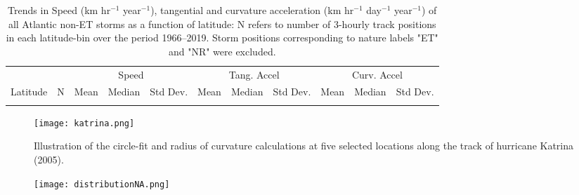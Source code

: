 \documentclass[wcd,manuscript]{copernicus}
\begin{document}





\begin{table*}[t]
\caption{Trends in Speed (km hr$^{-1}$ year$^{-1}$), tangential and curvature acceleration  (km hr$^{-1}$ day$^{-1}$ year$^{-1}$) of all Atlantic non-ET storms as a function of latitude: N refers to number of 3-hourly track positions in each latitude-bin over the period 1966--2019. Storm positions corresponding to 
nature labels "ET" and "NR" were excluded.}

\begin{tabular}{cc|ccc|ccc|ccc}
\tophline
& & \multicolumn{3}{|c|}{Speed} & \multicolumn{3}{c|}{Tang. Accel} & \multicolumn{3}{c}{Curv. Accel}\\
\middlehline
Latitude & N & Mean & Median & Std Dev. & Mean & Median &  Std Dev.& Mean & Median & Std Dev.\\

\bottomhline
\end{tabular}
\label{tab:ATLSA}
\end{table*}







\begin{figure*}[t]
\texttt{[image: katrina.png]}
 \caption{Illustration of the circle-fit and radius of curvature calculations at five selected locations along the track of hurricane Katrina (2005).}\label{fig:track}
\end{figure*}

\begin{figure}[ht]
  \centering
    \texttt{[image: distributionNA.png]}
  \caption{}
  \label{fig:distNA}
\end{figure}


\end{document}
